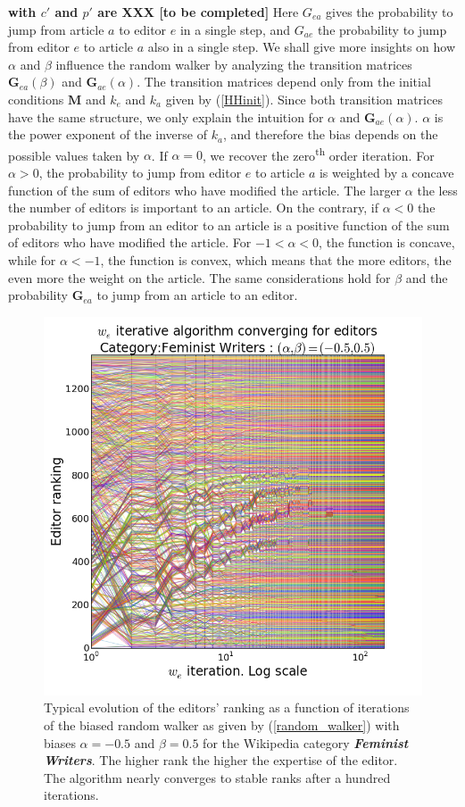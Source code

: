{\bf with $c'$ and $p'$ are XXX [to be completed]} Here $G_{ea}$ gives the probability to jump from article $a$ to editor $e$ in a single step, and $G_{ae}$ the probability to jump from editor $e$ to article $a$ also in a single step. We shall give more insights on how $\alpha$ and $\beta$ influence the random walker by analyzing the transition matrices $\mathbf{G}_{ea}(\beta)$ and $\mathbf{G}_{ae}(\alpha)$. The transition matrices depend only from the initial conditions $\mathbf{M}$ and $k_e$ and $k_a$ given by (\ref{HHinit}). Since both transition matrices have the same structure, we only explain the intuition for  $\alpha$ and $\mathbf{G}_{ae}(\alpha)$. $\alpha$ is the power exponent of the inverse of $k_a$, and therefore the bias depends on the possible values taken by $\alpha$. If $\alpha = 0$, we recover the zero\textsuperscript{th} order iteration. For $\alpha > 0$, the probability to jump from editor $e$ to article $a$ is weighted by a concave function of the sum of editors who have modified the article. The larger $\alpha$ the less the number of editors is important to an article. On the contrary, if $\alpha < 0$ the probability to jump from an editor to an article is a positive function of the sum of editors who have modified the article. For $-1 < \alpha < 0$, the function is concave, while for $\alpha < -1$, the function is convex, which means that the more editors, the even more the weight on the article. The same considerations hold for $\beta$ and the probability $\mathbf{G}_{ea}$ to jump from an article to an editor.

\begin{figure}[!t]
\centering
\includegraphics[width=0.9\columnwidth]{Figures/fem_editors_iter_converge.png}
\caption{Typical evolution of the editors' ranking as a function of iterations of the biased random walker as given by (\ref{random_walker}) with biases $\alpha = -0.5$ and $\beta = 0.5$ for the Wikipedia category \textit{\textbf{ Feminist Writers}}. The higher rank the higher the expertise of the editor. The algorithm nearly converges to stable ranks after a hundred iterations.}
\label{fig:convergence}
\end{figure}

